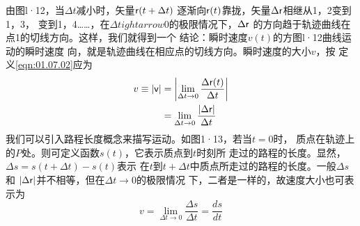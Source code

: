 由图l·12，当$\Delta t$减小时，矢量${\sf r}(t+\Delta t)$
逐渐向${\sf r}(t)$靠拢，矢量$\Delta {\sf r}$相继从1，2变到1，3，
变到1，4……，在$\Delta t ightarrow 0$的极限情况下，$\Delta {\sf r}$
的方向趋于轨迹曲线在点1的切线方向。这样，我们就得到一个
结论：瞬时速度$v(t)$的方图l·12曲线运动的瞬时速度
向，就是轨迹曲线在相应点的切线方向。瞬时速度的大小$v$，按
定义\eqref{eqn:01.07.02}应为
\begin{equation*}
    \begin{aligned}
        v\equiv |{\sf v}| & =\left|\lim _{\Delta t \rightarrow 0} \frac{\Delta {\sf r}(t)}{\Delta t}\right| \\
                         & =\lim _{\Delta t \rightarrow 0} \frac{|\Delta {\sf r}|}{\Delta t}
    \end{aligned}
\end{equation*}
我们可以引入路程长度概念来描写运动。如图1·13，若当$t=0$时，
质点在轨迹上的$P$处。则可定义函数$s(t)$，它表示质点到$t$时刻所
走过的路程的长度。显然，$\Delta s=s(t+\Delta t)-s(t)$表示
在$t$到$t+\Delta t$中质点所走过的路程的长度。一般$\Delta s$和
$|\Delta {\sf r}|$并不相等，但在$\Delta t \rightarrow 0$的极限情况
下，二者是一样的，故速度大小也可表示为
\begin{equation}\label{eqn:01.07.05}
    v=\lim_{\Delta t \rightarrow 0}\frac{\Delta s}{\Delta t}=\frac{ds}{dt}
\end{equation}

